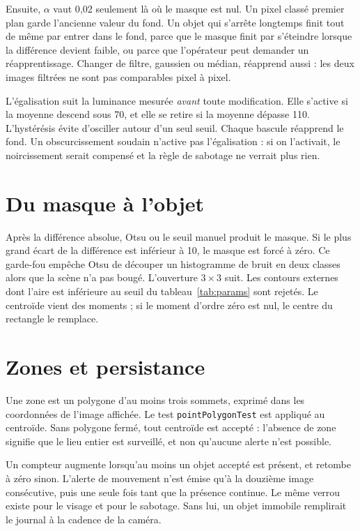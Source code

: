 Ensuite, $\alpha$ vaut 0{,}02 seulement là où le masque est nul. Un pixel classé premier plan garde l'ancienne valeur du fond. Un objet qui s'arrête longtemps finit tout de même par entrer dans le fond, parce que le masque finit par s'éteindre lorsque la différence devient faible, ou parce que l'opérateur peut demander un réapprentissage. Changer de filtre, gaussien ou médian, réapprend aussi : les deux images filtrées ne sont pas comparables pixel à pixel.

L'égalisation suit la luminance mesurée \emph{avant} toute modification. Elle s'active si la moyenne descend sous 70, et elle se retire si la moyenne dépasse 110. L'hystérésis évite d'osciller autour d'un seul seuil. Chaque bascule réapprend le fond. Un obscurcissement soudain n'active pas l'égalisation : si on l'activait, le noircissement serait compensé et la règle de sabotage ne verrait plus rien.

\section{Du masque à l'objet}

Après la différence absolue, Otsu ou le seuil manuel produit le masque. Si le plus grand écart de la différence est inférieur à 10, le masque est forcé à zéro. Ce garde-fou empêche Otsu de découper un histogramme de bruit en deux classes alors que la scène n'a pas bougé. L'ouverture $3\times 3$ suit. Les contours externes dont l'aire est inférieure au seuil du tableau~\ref{tab:params} sont rejetés. Le centroïde vient des moments ; si le moment d'ordre zéro est nul, le centre du rectangle le remplace.

\section{Zones et persistance}

Une zone est un polygone d'au moins trois sommets, exprimé dans les coordonnées de l'image affichée. Le test \texttt{pointPolygonTest} est appliqué au centroïde. Sans polygone fermé, tout centroïde est accepté : l'absence de zone signifie que le lieu entier est surveillé, et non qu'aucune alerte n'est possible.

Un compteur augmente lorsqu'au moins un objet accepté est présent, et retombe à zéro sinon. L'alerte de mouvement n'est émise qu'à la douzième image consécutive, puis une seule fois tant que la présence continue. Le même verrou existe pour le visage et pour le sabotage. Sans lui, un objet immobile remplirait le journal à la cadence de la caméra.

